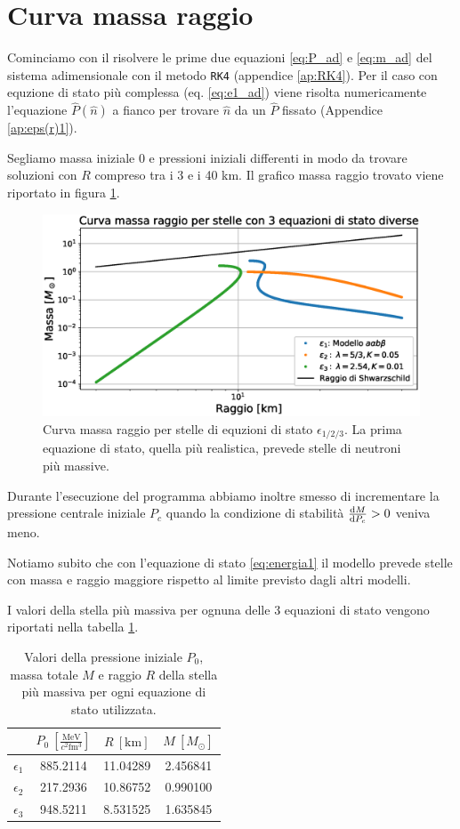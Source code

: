 \documentclass[a4paper, titlepage]{article}
\newcommand{\Punit}[0]{\frac{\unit{\mega\electronvolt}}{c^2 \unit{\femto\cubic\meter}}}
\begin{document}
\section{Curva massa raggio}
Cominciamo con il risolvere le prime due equazioni \ref{eq:P_ad} e \ref{eq:m_ad}
del sistema adimensionale con il metodo \texttt{RK4} (appendice \ref{ap:RK4}).
Per il caso con equzione di stato più complessa (eq. \ref{eq:e1_ad}) viene
risolta numericamente l'equazione $\hat P(\hat n)$ a fianco per trovare $\hat n$
da un $\hat P$ fissato (Appendice \ref{ap:eps(r)1}).

Segliamo massa iniziale 0 e pressioni iniziali differenti in modo da trovare
soluzioni con $R$ compreso tra i 3 e i 40 \unit{\kilo\meter}.
Il grafico massa raggio trovato viene riportato in figura \ref{fig:MR}.

\begin{figure}[h]
        \centering
        \includegraphics[width = 0.7 \textwidth]{Figures/MR.eps}
        \caption{Curva massa raggio per stelle di equzioni di stato
        $\epsilon_{1/2/3}$.
        La prima equazione di stato, quella più realistica,
        prevede stelle di neutroni più massive.}
        \label{fig:MR}
\end{figure}

Durante l'esecuzione del programma abbiamo inoltre smesso di incrementare la
pressione centrale iniziale $P_c$ quando la condizione di stabilità
$\dv{M}{P_c} > 0$ veniva meno.

Notiamo subito che con l'equazione di stato \ref{eq:energia1} il modello prevede
stelle con massa e raggio maggiore rispetto al limite previsto dagli altri
modelli.

I valori della stella più massiva per ognuna delle 3 equazioni di stato vengono
riportati nella tabella \ref{tab:Mgrosso}.

\begin{table}[h!]
    \centering
    \begin{tabular}{c|c|c|c}
        & $P_0~[\Punit]$ & $R~[\unit{\kilo\meter}]$ & $M~[M_\odot]$ \\
         \hline
         $\epsilon_1$ & 885.2114 & 11.04289 & 2.456841 \\
         \hline
         $\epsilon_2$ & 217.2936 & 10.86752 & 0.990100 \\
         \hline
         $\epsilon_3$ & 948.5211 & 8.531525 & 1.635845 \\
    \end{tabular}
    \caption{Valori della pressione iniziale $P_0$, massa totale $M$ e raggio
    $R$ della stella più massiva per ogni equazione di stato utilizzata.}
    \label{tab:Mgrosso}
\end{table}
\end{document}
